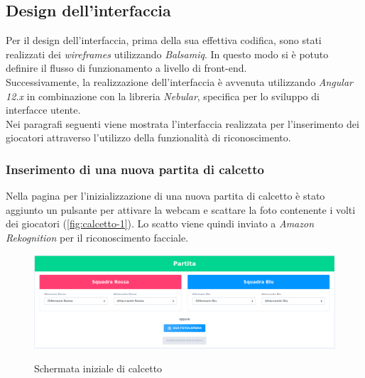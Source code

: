		
		
	
	
	\subsection{Design dell'interfaccia}
	Per il design dell'interfaccia, prima della sua effettiva codifica, sono stati realizzati dei \emph{wireframes} utilizzando \emph{Balsamiq}. In questo modo si è potuto definire il flusso di funzionamento a livello di front-end. \\ 

	\noindent Successivamente, la realizzazione dell'interfaccia è avvenuta utilizzando \emph{Angular 12.x} in combinazione con la libreria 
	\emph{Nebular}, specifica per lo sviluppo di interfacce utente. \\
	
	\noindent Nei paragrafi seguenti viene mostrata l'interfaccia realizzata per l'inserimento dei giocatori attraverso l'utilizzo della funzionalità di riconoscimento.
	
		\subsubsection{Inserimento di una nuova partita di calcetto}
		Nella pagina per l'inizializzazione di una nuova partita di calcetto è stato aggiunto un pulsante per attivare la webcam e scattare la foto  contenente i volti dei giocatori (\autoref{fig:calcetto-1}). Lo scatto viene quindi inviato a \emph{Amazon Rekognition} per il riconoscimento facciale. 
		
		\begin{figure}[H]
			\centering
			\includegraphics[width=\textwidth]{immagini/calcetto-1.png} \\
			\caption{\label{fig:calcetto-1} Schermata iniziale di calcetto}
		\end{figure}
	
